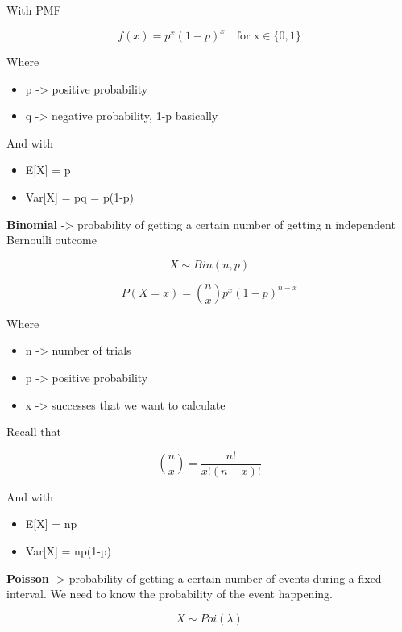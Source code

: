 With PMF

\begin{equation}
    f(x) = p^x(1-p)^x \quad \text{for x} \in \{0, 1\}
\end{equation}

Where

\begin{itemize}
    \item p -> positive probability
    \item q -> negative probability, 1-p basically
\end{itemize}

And with
\begin{itemize}
    \item E[X] = p
    \item Var[X] = pq = p(1-p)
\end{itemize}


\textbf{Binomial} -> probability of getting a certain number of getting n independent Bernoulli outcome

\begin{equation}
    X \sim Bin(n, p)
\end{equation}

\begin{equation}
    P(X=x) = \binom{n}{x}p^x(1-p)^{n-x}
\end{equation}

Where
\begin{itemize}
    \item n -> number of trials
    \item p -> positive probability
    \item x -> successes that we want to calculate
\end{itemize}

Recall that

\begin{equation}
    \binom{n}{x} = \frac{n!}{x!(n-x)!}
\end{equation}

And with
\begin{itemize}
    \item E[X] = np
    \item Var[X] = np(1-p)
\end{itemize}


\textbf{Poisson} -> probability of getting a certain number of events during a fixed interval. We need to know the probability of the event happening.

\begin{equation}
    X \sim Poi(\lambda)
\end{equation}

